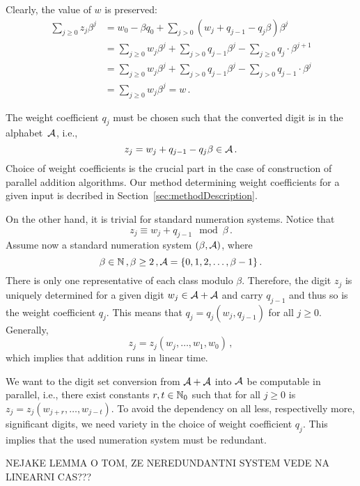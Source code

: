      Clearly, the value of $w$ is preserved:
\begin{align*}
    \sum_{j\geq 0} z_j \beta^j &=w_0 - \beta q_0 + \sum_{j> 0} (w_j + q_{j-1} - q_j \beta) \beta^j \\
    &=\sum_{j\geq 0} w_j \beta^j + \sum_{j>0} q_{j-1} \beta^j - \sum_{j\geq 0} q_j \cdot \beta^{j+1} \\
    &=\sum_{j\geq 0} w_j \beta^j + \sum_{j>0} q_{j-1} \beta^j - \sum_{j> 0} q_{j-1} \cdot \beta^j \\
    &=\sum_{j\geq 0} w_j \beta^j = w\,.
\end{align*}

     The weight coefficient $q_j$ must be chosen such that the converted digit is in the alphabet~$\mathcal{A}$, i.e., 
    \begin{equation}
    \label{eq:conversionFormula}
        z_j=w_j + q_{j-1} - q_j \beta \in \mathcal{A}\,.
    \end{equation}
    Choice of weight coefficients is the crucial part in the case of construction of parallel addition algorithms. Our method determining weight coefficients for a given input is decribed in Section~\ref{sec:methodDescription}.
    
     On the other hand, it is trivial for standard numeration systems.  Notice that
    $$
        z_j \equiv w_j+q_{j-1} \mod \beta\,. 
    $$
  Assume now a standard numeration system $(\beta, \mathcal{A})$, where
  $$
    \beta \in \mathbb{N}\,,\beta  \geq 2\,, \mathcal{A} = \{0, 1, 2,\dots, \beta -1 \}\,.
  $$ 
  There is only one representative of each class modulo  $\beta$. Therefore, the digit $z_j$ is uniquely determined for a given digit $w_j \in \mathcal{A}+\mathcal{A}$ and carry $q_{j-1}$ and thus so is the weight coefficient $q_j$. This means that $q_j=q_j(w_j,q_{j-1})$ for all $j\geq 0$. Generally,
  $$
  z_j=z_j(w_j ,\dots , w_1, w_0)\,,
  $$
  which implies that addition runs in linear time.
  
  We want to the digit set conversion from $\mathcal{A}+\mathcal{A}$ into $\mathcal{A}$ be computable in parallel, i.e., there exist constants $r,t \in \mathbb{N}_0$ such that for all $j\geq 0$ is $z_j=z_j(w_{j+r},\dots,w_{j-t})$. To avoid the dependency on all less, respectivelly more, significant digits, we need variety in the choice of weight coefficient $q_j$. This implies that the used numeration system must be redundant.
  
  
  
  NEJAKE LEMMA O TOM, ZE NEREDUNDANTNI SYSTEM VEDE NA LINEARNI CAS???


